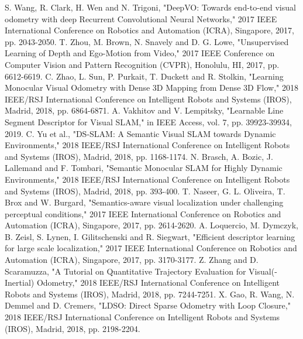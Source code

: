 \documentclass[letterpaper, 10 pt, conference]{ieeeconf}  %
\begin{document}
\begin{thebibliography}{99}
 S. Wang, R. Clark, H. Wen and N. Trigoni, "DeepVO: Towards end-to-end visual odometry with deep Recurrent Convolutional Neural Networks," 2017 IEEE International Conference on Robotics and Automation (ICRA), Singapore, 2017, pp. 2043-2050.
 T. Zhou, M. Brown, N. Snavely and D. G. Lowe, "Unsupervised Learning of Depth and Ego-Motion from Video," 2017 IEEE Conference on Computer Vision and Pattern Recognition (CVPR), Honolulu, HI, 2017, pp. 6612-6619.
 C. Zhao, L. Sun, P. Purkait, T. Duckett and R. Stolkin, "Learning Monocular Visual Odometry with Dense 3D Mapping from Dense 3D Flow," 2018 IEEE/RSJ International Conference on Intelligent Robots and Systems (IROS), Madrid, 2018, pp. 6864-6871.
 A. Vakhitov and V. Lempitsky, "Learnable Line Segment Descriptor for Visual SLAM," in IEEE Access, vol. 7, pp. 39923-39934, 2019.
 C. Yu et al., "DS-SLAM: A Semantic Visual SLAM towards Dynamic Environments," 2018 IEEE/RSJ International Conference on Intelligent Robots and Systems (IROS), Madrid, 2018, pp. 1168-1174.
 N. Brasch, A. Bozic, J. Lallemand and F. Tombari, "Semantic Monocular SLAM for Highly Dynamic Environments," 2018 IEEE/RSJ International Conference on Intelligent Robots and Systems (IROS), Madrid, 2018, pp. 393-400.
 T. Naseer, G. L. Oliveira, T. Brox and W. Burgard, "Semantics-aware visual localization under challenging perceptual conditions," 2017 IEEE International Conference on Robotics and Automation (ICRA), Singapore, 2017, pp. 2614-2620.
 A. Loquercio, M. Dymczyk, B. Zeisl, S. Lynen, I. Gilitschenski and R. Siegwart, "Efficient descriptor learning for large scale localization," 2017 IEEE International Conference on Robotics and Automation (ICRA), Singapore, 2017, pp. 3170-3177.
 Z. Zhang and D. Scaramuzza, "A Tutorial on Quantitative Trajectory Evaluation for Visual(-Inertial) Odometry," 2018 IEEE/RSJ International Conference on Intelligent Robots and Systems (IROS), Madrid, 2018, pp. 7244-7251.
 X. Gao, R. Wang, N. Demmel and D. Cremers, "LDSO: Direct Sparse Odometry with Loop Closure," 2018 IEEE/RSJ International Conference on Intelligent Robots and Systems (IROS), Madrid, 2018, pp. 2198-2204.
\end{thebibliography}
\end{document}
